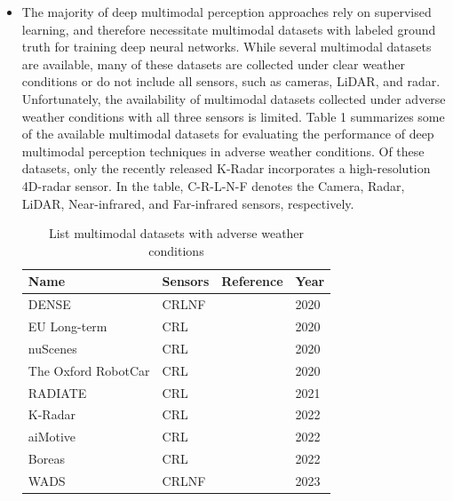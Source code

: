 \documentclass[rnd]{mas_proposal}
\begin{document}
\begin{itemize}
      \item The majority of deep multimodal perception approaches rely on supervised learning, and therefore necessitate multimodal datasets with labeled ground truth for training deep neural networks. While several multimodal datasets are available, many of these datasets are collected under clear weather conditions or do not include all sensors, such as cameras, LiDAR, and radar. Unfortunately, the availability of multimodal datasets collected under adverse weather conditions with all three sensors is limited. Table 1 summarizes some of the available multimodal datasets for evaluating the performance of deep multimodal perception techniques in adverse weather conditions. Of these datasets, only the recently released K-Radar \cite{Paek2022Jun} incorporates a high-resolution 4D-radar sensor. In the table, C-R-L-N-F denotes the Camera, Radar, LiDAR, Near-infrared, and Far-infrared sensors, respectively.
          \begin{table}[h]
              \centering
              \caption{List multimodal datasets with adverse weather conditions}
              \label{tab:my-table}
              \begin{tabular}{|l|l|l|l|}
                  \hline
                  \textbf{Name}       & \textbf{Sensors} & \textbf{Reference}               & \textbf{Year} \\ \hline
                  DENSE               & CRLNF            & \cite{bijelic2020seeing}    & 2020          \\ \hline
                  EU Long-term        & CRL              & \cite{yan2020eu}            & 2020          \\ \hline
                  nuScenes            & CRL              & \cite{caesar2020nuscenes}   & 2020          \\ \hline
                  The Oxford RobotCar & CRL              & \cite{barnes2020oxford}     & 2020          \\ \hline
                  RADIATE             & CRL              & \cite{sheeny2021radiate}    & 2021          \\ \hline
                  K-Radar             & CRL              & \cite{Paek2022Jun}          & 2022          \\ \hline
                  aiMotive            & CRL              & \cite{matuszka2022aimotive} & 2022          \\ \hline
                  Boreas              & CRL              & \cite{burnett2022boreas}    & 2022          \\ \hline
                  WADS                & CRLNF            & \cite{kurup2022winter}      & 2023          \\ \hline
              \end{tabular}
          \end{table}


\end{itemize}
\end{document}
